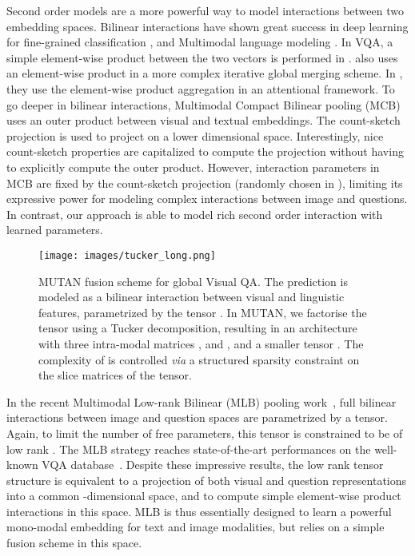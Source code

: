 \documentclass[10pt,twocolumn,letterpaper]{article}
\begin{document}
Second order models are a more powerful way to model interactions between two embedding spaces. Bilinear interactions have shown great success in deep learning for fine-grained classification \cite{lin2015bilinear}, and Multimodal language modeling  \cite{icml2014c2_kiros14}.
In VQA, a simple element-wise product between the two vectors is performed in \cite{VQA}. \cite{kim2016b} also uses  an element-wise product
in a more complex iterative global merging scheme.  In \cite{NIPS2016_6261}, they use the element-wise product aggregation in an attentional framework. To go deeper in bilinear interactions,  Multimodal Compact Bilinear pooling (MCB)~\cite{fukui16mcb} uses an outer product  between visual  and textual  embeddings. The count-sketch projection \cite{Charikar:2002:FFI:646255.684566} 
is used to project  on a lower dimensional space. Interestingly, nice count-sketch properties are capitalized to compute the projection
without having to explicitly compute the outer product. 
However, interaction parameters in MCB are fixed
by the count-sketch projection (randomly chosen in ), limiting its expressive power for modeling complex interactions between image and questions. In contrast, our approach is able to model 
rich second order interaction with learned parameters. 

\begin{figure*}[htbp]
\begin{center}
\texttt{[image: images/tucker\_long.png]}
\caption{\label{whole_model} MUTAN fusion scheme for global Visual QA. 
The prediction is modeled as a bilinear interaction between visual and linguistic features, parametrized by the tensor . 
In MUTAN, we factorise the tensor  using a Tucker decomposition, resulting in an architecture with three intra-modal matrices ,  and , 
and a smaller tensor . The complexity of  is controlled \textit{via} a structured sparsity constraint on the slice matrices of the tensor.} 
\end{center}
\end{figure*}


In the recent Multimodal Low-rank Bilinear (MLB) pooling work~\cite{Kim2017}, full bilinear interactions 
between image and question spaces are parametrized by a tensor. Again, to limit the number of free parameters, this tensor is constrained to be of low rank . The MLB strategy reaches state-of-the-art performances on the  well-known VQA database~\cite{VQA}. Despite these impressive results, the low rank tensor structure is equivalent to a projection of both visual and question representations into a common -dimensional space,  and to compute simple element-wise product interactions in this space. 
MLB is thus essentially designed to learn a powerful mono-modal embedding for text and image modalities, but relies on a simple 
fusion scheme in this space. 
\end{document}
